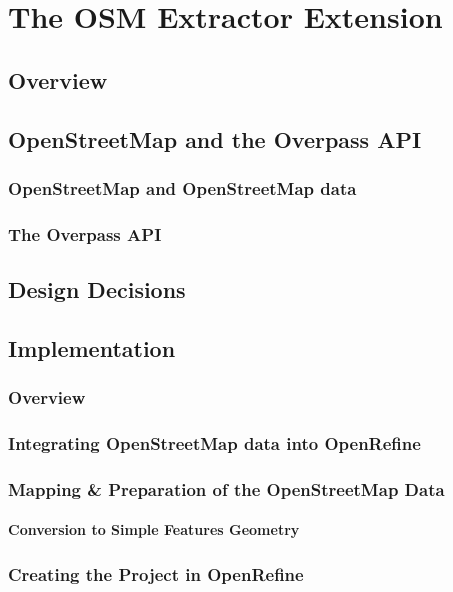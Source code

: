 \chapter{The OSM Extractor Extension}

\section{Overview}
\lipsum[3-6]

\section{OpenStreetMap and the Overpass API}
\subsection{OpenStreetMap and OpenStreetMap data}
\lipsum[7-9]
\subsection{The Overpass API}
\lipsum[9-11]

\section{Design Decisions}
\lipsum[13-17]

\section{Implementation}
\subsection{Overview}
\lipsum[13-16]
\subsection{Integrating OpenStreetMap data into OpenRefine}
\lipsum[16-18]
\subsection{Mapping \& Preparation of the OpenStreetMap Data}
\lipsum[19-21]
\subsubsection{Conversion to Simple Features Geometry}
\lipsum[21-23]
\subsection{Creating the Project in OpenRefine}
